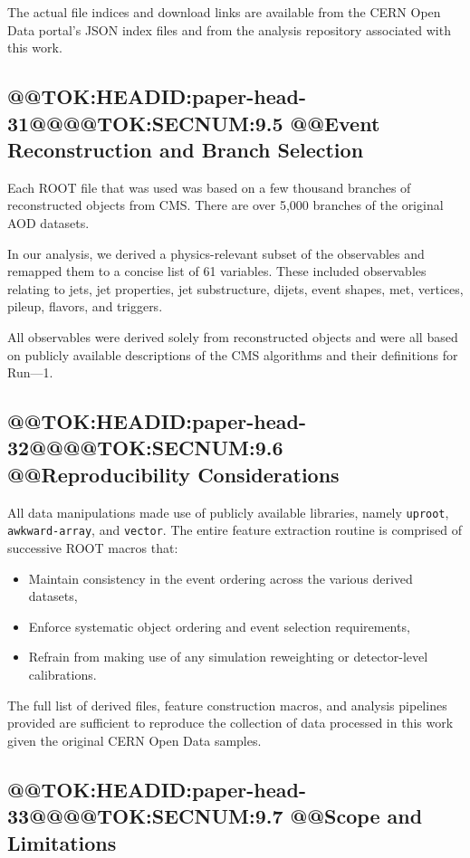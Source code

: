 \documentclass[11pt]{article}
\begin{document}
The actual file indices and download links are available from the CERN Open Data portal's JSON index files and from the analysis repository associated with this work.

\subsection{@@TOK:HEADID:paper-head-31@@@@TOK:SECNUM:9.5 @@Event Reconstruction and Branch Selection}

Each ROOT file that was used was based on a few thousand branches of reconstructed objects from CMS.
There are over 5,000 branches of the original AOD datasets.

In our analysis, we derived a physics-relevant subset of the observables and remapped them to a concise list of 61 variables.
These included observables relating to jets, jet properties, jet substructure, dijets, event shapes, met, vertices, pileup, flavors, and triggers.

All observables were derived solely from reconstructed objects and were all based on publicly available descriptions of the CMS algorithms and their definitions for Run---1.

\subsection{@@TOK:HEADID:paper-head-32@@@@TOK:SECNUM:9.6 @@Reproducibility Considerations}

All data manipulations made use of publicly available libraries, namely \texttt{uproot}, \texttt{awkward-array}, and \texttt{vector}.
The entire feature extraction routine is comprised of successive ROOT macros that:
\begin{itemize}
    \item Maintain consistency in the event ordering across the various derived datasets,
    \item Enforce systematic object ordering and event selection requirements,
    \item Refrain from making use of any simulation reweighting or detector-level calibrations.
\end{itemize}

The full list of derived files, feature construction macros, and analysis pipelines provided are sufficient to reproduce the collection of data processed in this work given the original CERN Open Data samples.

\subsection{@@TOK:HEADID:paper-head-33@@@@TOK:SECNUM:9.7 @@Scope and Limitations}
\end{document}
